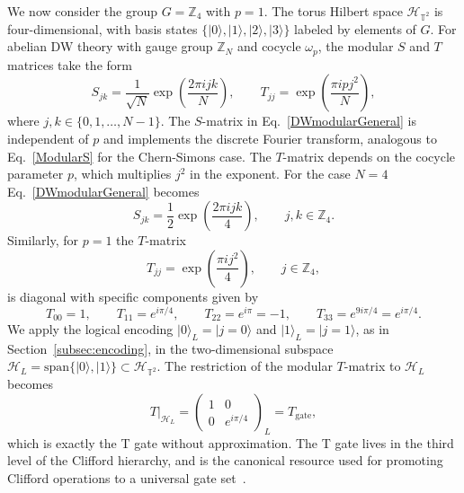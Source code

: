 \documentclass[12pt,a4paper]{article}
\def\ket#1{{|{#1}\rangle}}
\begin{document}
We now consider the group $G = \mathbb{Z}_4$ with $p = 1$. The torus Hilbert space $\mathcal{H}_{\mathbb{T}^2}$ is four-dimensional, with basis states $\{\ket{0}, \ket{1}, \ket{2}, \ket{3}\}$ labeled by elements of $G$. For abelian DW theory with gauge group $\mathbb{Z}_N$ and cocycle $\omega_p$, the modular $S$ and $T$ matrices take the form~\cite{Dijkgraaf:1990,Propitius:1995}
%
\begin{equation}\label{DWmodularGeneral}
S_{jk} = \frac{1}{\sqrt{N}}\exp\left(\frac{2\pi i jk}{N}\right), \qquad T_{jj} = \exp\left(\frac{\pi i p j^2}{N}\right),
\end{equation}
%
where $j, k \in \{0, 1, \ldots, N-1\}$. The $S$-matrix in Eq.\ \eqref{DWmodularGeneral} is independent of $p$ and implements the discrete Fourier transform, analogous to Eq.\ \eqref{ModularS} for the Chern-Simons case. The $T$-matrix depends on the cocycle parameter $p$, which multiplies $j^2$ in the exponent. For the case $N = 4$ Eq.\ \eqref{DWmodularGeneral} becomes
%
\begin{equation}\label{DWSmatrix}
S_{jk} = \frac{1}{2}\exp\left(\frac{2\pi i jk}{4}\right), \qquad j, k \in \mathbb{Z}_4.
\end{equation}
%
Similarly, for $p = 1$ the $T$-matrix
%
\begin{equation}\label{DWTmatrix}
T_{jj} = \exp\left(\frac{\pi i j^2}{4}\right), \qquad j \in \mathbb{Z}_4,
\end{equation}
%
is diagonal with specific components given by
%
\begin{equation}\label{DWTentries}
T_{00} = 1, \qquad T_{11} = e^{i\pi/4}, \qquad T_{22} = e^{i\pi} = -1, \qquad T_{33} = e^{9i\pi/4} = e^{i\pi/4}.
\end{equation}
%
We apply the logical encoding $\ket{0}_L = \ket{j=0}$ and $\ket{1}_L = \ket{j=1}$, as in Section~\ref{subsec:encoding}, in the two-dimensional subspace $\mathcal{H}_L = \mathrm{span}\{\ket{0}, \ket{1}\} \subset \mathcal{H}_{\mathbb{T}^2}$. The restriction of the modular $T$-matrix to $\mathcal{H}_L$ becomes
%
\begin{equation}\label{TgateFromDW}
T\big|_{\mathcal{H}_L} = \begin{pmatrix} 1 & 0 \\ 0 & e^{i\pi/4} \end{pmatrix}_L = T_{\mathrm{gate}},
\end{equation}
%
which is exactly the T gate without approximation. The T gate lives in the third level of the Clifford hierarchy, and is the canonical resource used for promoting Clifford operations to a universal gate set~\cite{Bravyi2004}.
\end{document}
